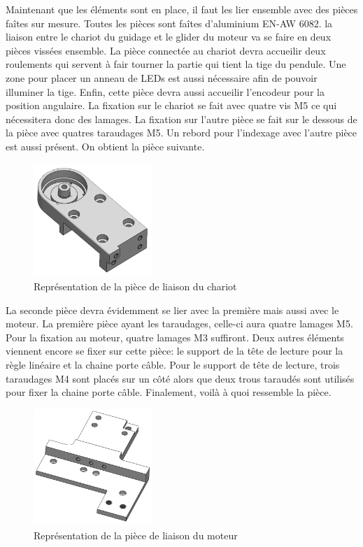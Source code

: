 Maintenant que les éléments sont en place, il faut les lier ensemble avec des pièces faîtes sur mesure. Toutes les pièces sont faîtes
d'aluminium EN-AW 6082. la liaison entre le chariot du guidage et le glider du moteur va se faire en deux pièces vissées ensemble. La pièce
connectée au chariot devra accueilir deux roulements qui servent à fair tourner la partie qui tient la tige du pendule. Une zone pour placer
un anneau de LEDs est aussi nécessaire afin de pouvoir illuminer la tige. Enfin, cette pièce devra aussi accueilir l'encodeur pour la position
angulaire. La fixation sur le chariot se fait avec quatre vis M5 ce qui nécessitera donc des lamages. La fixation sur l'autre pièce se fait sur
le dessous de la pièce avec quatres taraudages M5. Un rebord pour l'indexage avec l'autre pièce est aussi présent. On obtient la pièce suivante.

\begin{figure}[H]
  \centering
  \includegraphics[width = 0.4\textwidth]{assets/figures/LiaisonChariot.png}
  \caption{Représentation de la pièce de liaison du chariot}
  \label{fig:LiaisonChariot}
\end{figure}

La seconde pièce devra évidemment se lier avec la première mais aussi avec le moteur. La première pièce ayant les taraudages, celle-ci aura quatre
lamages M5. Pour la fixation au moteur, quatre lamages M3 suffiront. Deux autres éléments viennent encore se fixer sur cette pièce: le support de
la tête de lecture pour la règle linéaire et la chaine porte câble. Pour le support de tête de lecture, trois taraudages M4 sont placés sur un côté
alors que deux trous taraudés sont utilisés pour fixer la chaine porte câble. Finalement, voilà à quoi ressemble la pièce.

\begin{figure}[H]
  \centering
  \includegraphics[width = 0.4\textwidth]{assets/figures/LiaisonMoteur.png}
  \caption{Représentation de la pièce de liaison du moteur}
  \label{fig:LiaisonMoteur}
\end{figure}